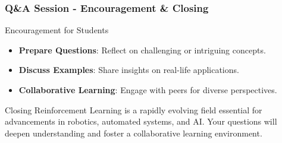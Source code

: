 \documentclass[aspectratio=169]{beamer}
\begin{document}
\begin{frame}[fragile]
    \frametitle{Q\&A Session - Encouragement & Closing}
    \begin{block}{Encouragement for Students}
        \begin{itemize}
            \item \textbf{Prepare Questions}: Reflect on challenging or intriguing concepts.
            \item \textbf{Discuss Examples}: Share insights on real-life applications.
            \item \textbf{Collaborative Learning}: Engage with peers for diverse perspectives.
        \end{itemize}
    \end{block}
    
    \begin{block}{Closing}
        Reinforcement Learning is a rapidly evolving field essential for advancements in robotics, automated systems, and AI. Your questions will deepen understanding and foster a collaborative learning environment.
    \end{block}
\end{frame}
\end{document}
